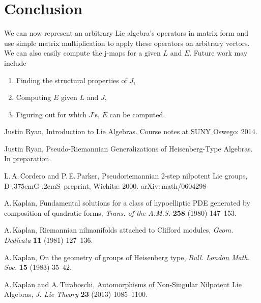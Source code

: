 \documentclass[11 pt]{article}
\newcommand{\DGS}{D{\kern-.375em}G{\kern-.2em}S}
\begin{document}
\section{Conclusion}
    We can now represent an arbitrary Lie algebra's operators in matrix form
    and use simple matrix multiplication to apply these operators on
    arbitrary vectors.  We can also easily compute the j-maps for a given $L$
    and $E$.  Future work may include
    \begin{enumerate}
        \item Finding the structural properties of $J$,
        \item Computing $E$ given $L$ and $J$,
        \item Figuring out for which $J$'s, $E$ can be computed.
    \end{enumerate}

\begin{thebibliography}{99}
Justin Ryan, Introduction to Lie Algebras. Course notes at SUNY Oswego: 2014.

Justin Ryan, Pseudo-Riemannian Generalizations of Heisenberg-Type Algebras. In preparation.

L.\,A.\,Cordero and P.\,E.\,Parker, Pseudoriemannian 2-step
nilpotent Lie groups, \DGS\ preprint, Wichita: 2000.
{\sf arXiv:\,math/0604298}

A.\,Kaplan, Fundamental solutions for a class of hypoelliptic PDE
generated by composition of quadratic forms, {\it Trans. of the A.M.S.}
{\bf 258}
(1980) 147--153.

A.\,Kaplan, Riemannian nilmanifolds attached to Clifford modules,
{\it Geom. Dedicata} {\bf 11} (1981) 127--136.

A.\,Kaplan, On the geometry of groups of Heisenberg type, {\it Bull.
London Math. Soc.} {\bf 15} (1983) 35--42.

A.\,Kaplan and A.\,Tiraboschi, Automorphisms of Non-Singular
Nilpotent Lie Algebras, {\it J. Lie Theory} {\bf 23} (2013) 1085--1100.
\end{thebibliography}
\end{document}

